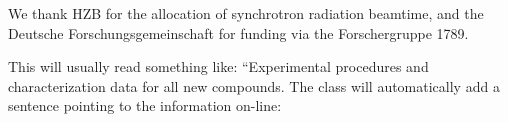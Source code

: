 \documentclass[journal=jpccck,manuscript=article,layout=twocolumn]{achemso}
\begin{document}

\begin{acknowledgement}
%
We thank HZB for the allocation of synchrotron radiation beamtime, and the Deutsche Forschungsgemeinschaft for funding via the Forschergruppe 1789.
%
\end{acknowledgement}

\begin{suppinfo}

This will usually read something like: ``Experimental procedures and
characterization data for all new compounds. The class will
automatically add a sentence pointing to the information on-line:

\end{suppinfo}


\end{document}
